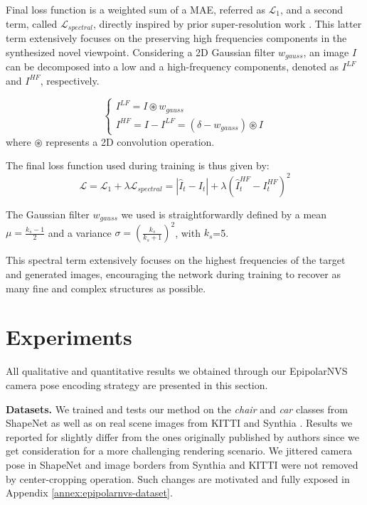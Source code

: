Final loss function is a weighted sum  of a \ac{MAE}, referred as $\mathcal{L}_{1}$, and a second term, called $\mathcal{L}_{spectral}$, directly inspired by prior super-resolution work \citep{fritsche2019frequency}. This latter term extensively focuses on the preserving high frequencies components in the synthesized novel viewpoint. Considering a 2D Gaussian filter $w_{gauss}$, an image $I$ can be decomposed into a low and a high-frequency components, denoted as $I^{LF}$ and $I^{HF}$, respectively. 

\begin{equation}
\begin{cases}
     I^{LF}  = I\circledast w_{gauss} \\
     I^{HF} = I - I^{LF} = (\delta - w_{gauss})\circledast I
\end{cases}
\end{equation}
where $\circledast$ represents a 2D convolution operation. 

The final loss function used during training is thus given by: 
\begin{equation}
    \mathcal{L} = \mathcal{L}_{1} + \lambda \mathcal{L}_{spectral} = |\hat{I}_{t} - I_{t}| + \lambda \left( \hat{I}_{t}^{HF} - I_{t}^{HF} \right)^{2}
    \label{eq:1}
\end{equation}
 \newline

The Gaussian filter $w_{gauss}$ we used is straightforwardly defined by a mean $\mu = \frac{k_{s}-1}{2}$ and a variance $\sigma = (\frac{k_{s}}{k_{s}+1})^{2}$, with $k_{s}$=5.

This spectral term extensively focuses on the highest frequencies of the target and generated images, encouraging the network during training to recover as many fine and complex structures as possible.

\section{Experiments}
All qualitative and quantitative results we obtained through our EpipolarNVS camera pose encoding strategy are presented in this section. \newline

\noindent\textbf{Datasets.} We trained and tests our method on the \textit{chair} and \textit{car} classes from ShapeNet \citep{chang2015shapenet} as well as on real scene images from KITTI \citep{geiger2012we} and Synthia \citep{ros2016synthia}.
Results we reported for \citep{kim2020novel} slightly differ from the ones originally published by authors since we get consideration for a more challenging rendering scenario. We jittered camera pose in ShapeNet \citep{chang2015shapenet} and image borders from Synthia \citep{ros2016synthia} and KITTI \citep{geiger2012we} were not removed by center-cropping operation. Such changes are motivated and fully exposed in Appendix \ref{annex:epipolarnvs-dataset}.  \newline

